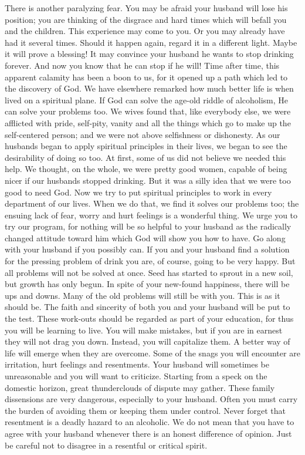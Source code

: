 \begin{biblechapter}
There is another paralyzing fear.  You may be afraid your husband will lose his position; you are thinking of the disgrace and hard times which will befall you and the children.  This experience may come to you.  Or you may already have had it several times.  Should it happen again, regard it in a different light.  Maybe it will prove a blessing!  It may convince your husband he wants to stop drinking forever.  And now you know that he can stop if he will!  Time after time, this apparent calamity has been a boon to us, for it opened up a path which led to the discovery of God.
We have elsewhere remarked how much better life is when lived on a spiritual plane.  If God can solve the age-old riddle of alcoholism, He can solve your problems too.  We wives found that, like everybody else, we were afflicted with pride, self-pity, vanity and all the things which go to make up the self-centered person; and we were not above selfishness or dishonesty.  As our husbands began to apply spiritual principles in their lives, we began to see the desirability of doing so too.
At first, some of us did not believe we needed this help.  We thought, on the whole, we were pretty good women, capable of being nicer if our husbands stopped drinking.  But it was a silly idea that we were too good to need God.  Now we try to put spiritual principles to work in every department of our lives.  When we do that, we find it solves our problems too; the ensuing lack of fear, worry and hurt feelings is a wonderful thing.  We urge you to try our program, for nothing will be so helpful to your husband as the radically changed attitude toward him which God will show you how to have.  Go along with your husband if you possibly can.
If you and your husband find a solution for the pressing problem of drink you are, of course, going to be very happy.  But all problems will not be solved at once.  Seed has started to sprout in a new soil, but growth has only begun.  In spite of your new-found happiness, there will be ups and downs.  Many of the old problems will still be with you.  This is as it should be.  
The faith and sincerity of both you and your husband will be put to the test.  These work-outs should be regarded as part of your education, for thus you will be learning to live.  You will make mistakes, but if you are in earnest they will not drag you down.  Instead, you will capitalize them.  A better way of life will emerge when they are overcome.
Some of the snags you will encounter are irritation, hurt feelings and resentments.  Your husband will sometimes be unreasonable and you will want to criticize.  Starting from a speck on the domestic horizon, great thunderclouds of dispute may gather.  These family dissensions are very dangerous, especially to your husband.  Often you must carry the burden of avoiding them or keeping them under control.  Never forget that resentment is a deadly hazard to an alcoholic.  We do not mean that you have to agree with your husband whenever there is an honest difference of opinion.  Just be careful not to disagree in a resentful or critical spirit.

\end{biblechapter}
